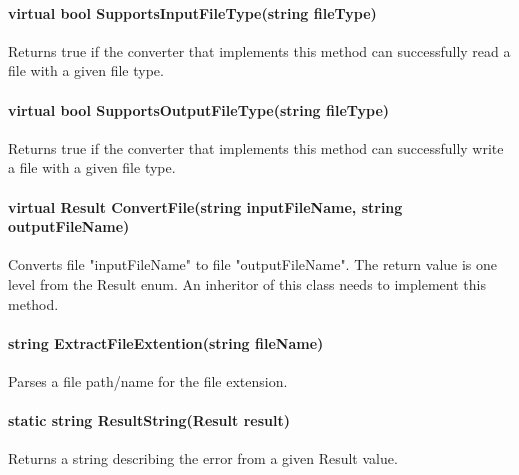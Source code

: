         \paragraph{virtual bool SupportsInputFileType(string fileType)}  
        \hfill \break
        Returns true if the converter that implements this method can successfully read a file with a given file type.

        \paragraph{virtual bool SupportsOutputFileType(string fileType)}
        \hfill \break
        Returns true if the converter that implements this method can successfully write a file with a given file type.

        \paragraph{virtual Result ConvertFile(string inputFileName, string outputFileName)}
        \hfill \break
        Converts file "inputFileName" to file "outputFileName".  The return value is one level from the Result enum.  An inheritor of this class needs to implement this method.

        \paragraph{string ExtractFileExtention(string fileName)}
        \hfill \break
        Parses a file path/name for the file extension.

        \paragraph{static string ResultString(Result result)}
        \hfill \break
        Returns a string describing the error from a given Result value.
